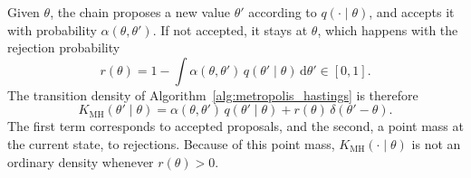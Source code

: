 Given $\theta$, the chain proposes a new value $\theta'$ according to $q(\cdot\mid\theta)$, and accepts it with probability $\alpha(\theta,\theta')$.
If not accepted, it stays at $\theta$, which happens with the rejection probability
\begin{equation}
    r(\theta) = 1 - \int \alpha(\theta,\theta')\,q(\theta'\mid\theta)\,\mathrm{d}\theta' \in [0,1].
\end{equation}
The transition density of Algorithm~\ref{alg:metropolis_hastings} is therefore
\begin{equation}
    K_{\mathrm{MH}}(\theta'\mid\theta) = \alpha(\theta,\theta')\,q(\theta'\mid\theta) + r(\theta)\,\delta(\theta'-\theta).
    \label{eq:mh_kernel}
\end{equation}
The first term corresponds to accepted proposals, and the second, a point mass at the current state, to rejections. Because of this point mass, $K_{\mathrm{MH}}(\cdot\mid\theta)$ is not an ordinary density whenever $r(\theta)>0$.

